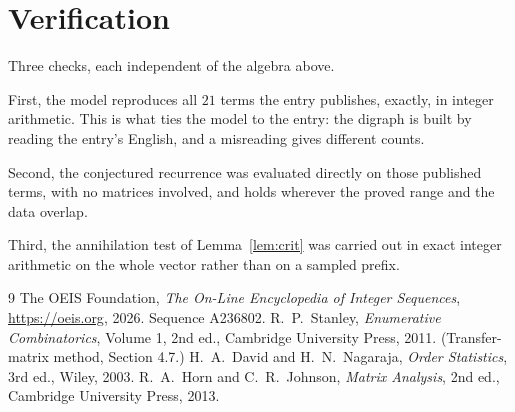 \documentclass[11pt,a4paper]{article}
\theoremstyle{plain}
\theoremstyle{definition}
\begin{document}
\section{Verification}

Three checks, each independent of the algebra above.

First, the model reproduces all $21$ terms the entry publishes, exactly, in integer
arithmetic. This is what ties the model to the entry: the digraph is built by reading the
entry's English, and a misreading gives different counts.

Second, the conjectured recurrence was evaluated directly on those published terms, with no
matrices involved, and holds wherever the proved range and the data overlap.

Third, the annihilation test of Lemma~\ref{lem:crit} was carried out in exact integer
arithmetic on the whole vector rather than on a sampled prefix.

\begin{thebibliography}{9}
 The OEIS Foundation, \emph{The On-Line Encyclopedia of Integer
Sequences}, \url{https://oeis.org}, 2026. Sequence A236802.
 R.~P.~Stanley, \emph{Enumerative Combinatorics}, Volume 1, 2nd ed.,
Cambridge University Press, 2011. (Transfer-matrix method, Section 4.7.)
 H.~A.~David and H.~N.~Nagaraja, \emph{Order Statistics}, 3rd ed., Wiley,
2003.
 R.~A.~Horn and C.~R.~Johnson, \emph{Matrix Analysis}, 2nd ed., Cambridge
University Press, 2013.
\end{thebibliography}
\end{document}
